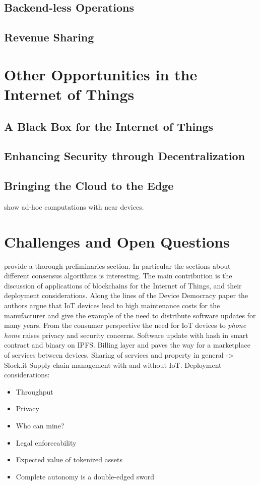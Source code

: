 \subsection{Backend-less Operations}

\subsection{Revenue Sharing}

\section{Other Opportunities in the Internet of Things}

\subsection{A Black Box for the Internet of Things}

\subsection{Enhancing Security through Decentralization}

\subsection{Bringing the Cloud to the Edge}

\cite{Loke:2015:MCS:2737797.2656214} show ad-hoc computations with near devices.

\section{Challenges and Open Questions}


\cite{Christidis2016} provide a thorough preliminaries section. In particular the sections about different consensus algorithms is interesting. The main contribution is the discussion of applications of blockchains for the Internet of Things, and their deployment considerations. Along the lines of the Device Democracy paper the authors argue that IoT devices lead to high maintenance costs for the manufacturer and give the example of the need to distribute software updates for many years. From the consumer perspective the need for IoT devices to \emph{phone home} raises privacy and security concerns.
Software update with hash in smart contract and binary on IPFS.
Billing layer and paves the way for a marketplace of services between devices.
Sharing of services and property in general -> Slock.it
Supply chain management with and without IoT.
Deployment considerations:
\begin{itemize}
\item Throughput
\item Privacy
\item Who can mine?
\item Legal enforceability
\item Expected value of tokenized assets
\item Complete autonomy is a double-edged sword
\end{itemize}


